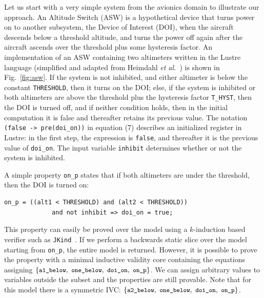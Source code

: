 \label{sec:example}


Let us start with a very simple system from the avionics domain to illustrate our approach. An Altitude Switch (ASW) is a hypothetical device that turns power on to another subsystem, the Device of Interest (DOI), when the aircraft descends below a threshold altitude, and turns the power off again after the aircraft ascends over the threshold plus some hysteresis factor.  An implementation of an ASW containing two altimeters written in the Lustre language (simplified and adapted from Heimdahl \textit{et al.}~\cite{HCW02:ase-deviation}) is shown in Fig.~\ref{fig:asw}.  If the system is not inhibited, and either altimeter is below the constant {\small \texttt{THRESHOLD}}, then it turns on the DOI; else, if the system is inhibited or both altimeters are above the threshold plus the hysteresis factor {\small \texttt{T\_HYST}}, then the DOI is turned off, and if neither condition holds, then in the initial computation it is false and thereafter retains its previous value.  The notation {\small \texttt{(false -> pre(doi\_on))}} in equation (7) describes an initialized register in Lustre: in the first step, the expression is {\small \texttt{false}}, and thereafter it is the previous value of {\small \texttt{doi\_on}}. The input variable {\small\texttt{inhibit}} determines whether or not the system is inhibited.

A simple property {\small \texttt{on\_p}} states that if both altimeters are under the threshold, then the DOI is turned on:
{\smaller
\begin{verbatim}
on_p = ((alt1 < THRESHOLD) and (alt2 < THRESHOLD))
             and not inhibit => doi_on = true;
\end{verbatim}
}
\noindent This property can easily be proved over the model using a $k$-induction based verifier such as \texttt{JKind}~\cite{jkind}.  
If we perform a backwards static slice over the model starting from {\small \texttt{on\_p}}, the entire model is returned.  However, it is possible to prove the property with a minimal inductive validity core containing the equations assigning $\{ { \small \texttt{a1\_below},~\texttt{one\_below}, ~\texttt{doi\_on},~\texttt{on\_p}}\}$. We can assign arbitrary values to variables outside the subset and the properties are still provable.  Note that for this model there is a symmetric IVC: $\{ {\small \texttt{a2\_below},~\texttt{one\_below}, ~\texttt{doi\_on},~\texttt{on\_p}}\}$.

